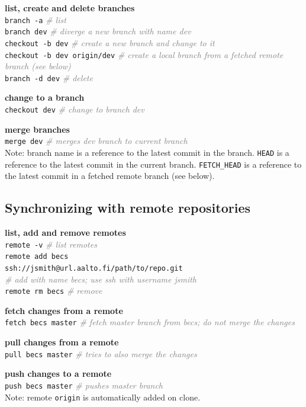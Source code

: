 \documentclass[landscape]{article}
\newcommand*{\prog}{\texttt}
\newcommand*{\proge}[1]{\textcolor{gray}{\textit{\# #1}}}
\begin{document}
\begin{multicols*}{3}
  \begin{myitemize}
    \item \textbf{list, create and delete branches}\\
      \prog{branch -a} \proge{list}\\
      \prog{branch dev} \proge{diverge a new branch with name dev}\\
      \prog{checkout -b dev} \proge{create a new branch and change to it}\\
      \prog{checkout -b dev origin/dev} \proge{create a local branch from a fetched remote branch (see below)}\\
      \prog{branch -d dev} \proge{delete}
    \item \textbf{change to a branch}\\
      \prog{checkout dev} \proge{change to branch dev}
    \item \textbf{merge branches}\\
      \prog{merge dev} \proge{merges dev branch to current branch}
      \vspace{\parsep}\\
      Note: branch name is a reference to the latest commit in the branch. \prog{HEAD} is a reference to the latest commit in the current branch. \prog{FETCH\_HEAD} is a reference to the latest commit in a fetched remote branch (see below).
  \end{myitemize}

  \subsection{Synchronizing with remote repositories}

  \begin{myitemize}
    \item \textbf{list, add and remove remotes}\\
      \prog{remote -v} \proge{list remotes}\\
      \prog{remote add becs\\\hspace*{5mm}ssh://jsmith@url.aalto.fi/path/to/repo.git}\\\proge{add with name becs; use ssh with username jsmith}\\
      \prog{remote rm becs} \proge{remove}
    \item \textbf{fetch changes from a remote}\\
      \prog{fetch becs master} \proge{fetch master branch from becs; do not merge the changes}
    \item \textbf{pull changes from a remote}\\
      \prog{pull becs master} \proge{tries to also merge the changes}
    \item \textbf{push changes to a remote}\\
      \prog{push becs master} \proge{pushes master branch}
      \vspace{\parsep}\\
      Note: remote \prog{origin} is automatically added on clone.
  \end{myitemize}


\end{multicols*}
\end{document}
